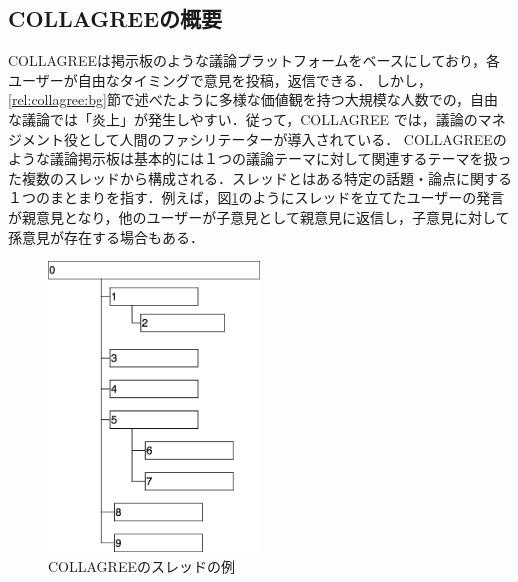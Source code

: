 \subsection{COLLAGREEの概要}
COLLAGREEは掲示板のような議論プラットフォームをベースにしており，各ユーザーが自由なタイミングで意見を投稿，返信できる．
しかし，\ref{rel:collagree:bg}節で述べたように多様な価値観を持つ大規模な人数での，自由な議論では「炎上」が発生しやすい．従って，COLLAGREE では，議論のマネジメント役として人間のファシリテーターが導入されている．
COLLAGREEのような議論掲示板は基本的には１つの議論テーマに対して関連するテーマを扱った複数のスレッドから構成される．スレッドとはある特定の話題・論点に関する１つのまとまりを指す．例えば，図\ref{Fig:thread1}のようにスレッドを立てたユーザーの発言が親意見となり，他のユーザーが子意見として親意見に返信し，子意見に対して孫意見が存在する場合もある．
\begin{figure}[htbp]
 \begin{center}
  \includegraphics[width=0.5\textwidth]{../images/2.Related_Work/COLLAGREE_thread.png}
  \caption{COLLAGREEのスレッドの例}
  \label{Fig:thread1}
  \vspace{-10pt}
 \end{center}
\end{figure}

